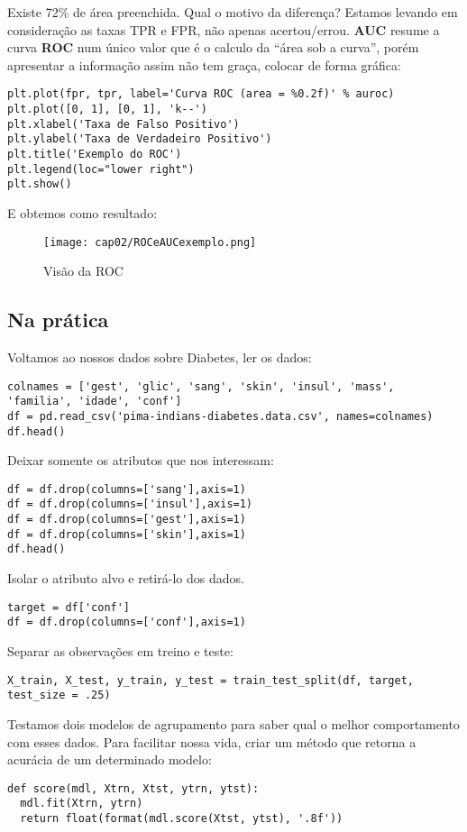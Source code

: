 Existe 72\% de área preenchida. Qual o motivo da diferença? Estamos levando em consideração as taxas TPR e FPR, não apenas acertou/errou. \textbf{AUC} resume a curva \textbf{ROC} num único valor que é o calculo da “área sob a curva”, porém apresentar a informação assim não tem graça, colocar de forma gráfica:
\begin{lstlisting}[]
plt.plot(fpr, tpr, label='Curva ROC (area = %0.2f)' % auroc)
plt.plot([0, 1], [0, 1], 'k--')
plt.xlabel('Taxa de Falso Positivo')
plt.ylabel('Taxa de Verdadeiro Positivo')
plt.title('Exemplo do ROC')
plt.legend(loc="lower right")
plt.show()
\end{lstlisting}

E obtemos como resultado:
\begin{figure}[H]
	\centering
	\texttt{[image: cap02/ROCeAUCexemplo.png]}
	\caption{Visão da ROC}
\end{figure}

\subsection{Na prática}
Voltamos ao nossos dados sobre Diabetes, ler os dados:
\begin{lstlisting}[]
colnames = ['gest', 'glic', 'sang', 'skin', 'insul', 'mass', 'familia', 'idade', 'conf']
df = pd.read_csv('pima-indians-diabetes.data.csv', names=colnames)
df.head()
\end{lstlisting}

Deixar somente os atributos que nos interessam:
\begin{lstlisting}[]
df = df.drop(columns=['sang'],axis=1)
df = df.drop(columns=['insul'],axis=1)
df = df.drop(columns=['gest'],axis=1)
df = df.drop(columns=['skin'],axis=1)
df.head()
\end{lstlisting}

Isolar o atributo alvo e retirá-lo dos dados. 
\begin{lstlisting}[]
target = df['conf']
df = df.drop(columns=['conf'],axis=1)
\end{lstlisting}

Separar as observações em treino e teste:
\begin{lstlisting}[]
X_train, X_test, y_train, y_test = train_test_split(df, target, test_size = .25)
\end{lstlisting}

Testamos dois modelos de agrupamento para saber qual o melhor comportamento com esses dados. Para facilitar nossa vida, criar um método que retorna a acurácia de um determinado modelo:
\begin{lstlisting}[]
def score(mdl, Xtrn, Xtst, ytrn, ytst):
  mdl.fit(Xtrn, ytrn)
  return float(format(mdl.score(Xtst, ytst), '.8f'))
\end{lstlisting}

